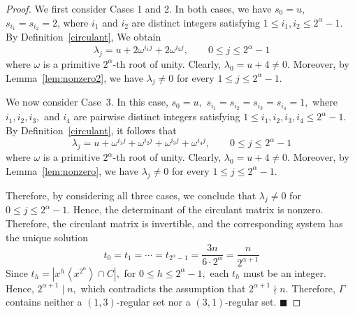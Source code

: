 \documentclass[12pt]{article}
\begin{document}
\begin{proof}
We first consider Cases 1 and 2. In both cases, we have $s_0=u$, $s_{i_1}=s_{i_2}=2$, where $i_1$ and $i_2$ are distinct integers satisfying $1\le i_1,i_2\le 2^\alpha-1$. By Definition~\ref{circulant}, We obtain
\[
\lambda_j
=
u+2\omega^{i_1j}+2\omega^{i_2j},
\qquad
0\le j\le 2^{\alpha}-1
\]
where $\omega$ is a primitive $2^{\alpha}$-th root of unity.
Clearly,
$
\lambda_0=u+4\neq0.
$
Moreover, by Lemma~\ref{lem:nonzero2}, we have $\lambda_j\ne0$ for every $1\le j\le 2^\alpha-1$.

We now consider Case~3. In this case,
$
s_0=u,$
$s_{i_1}=s_{i_2}=s_{i_3}=s_{i_4}=1,$
where \(i_1,i_2,i_3,\) and \(i_4\) are pairwise distinct integers satisfying
$
1\le i_1,i_2,i_3,i_4\le 2^{\alpha}-1.
$
By Definition~\ref{circulant}, it follows that
\[
\lambda_j
=
u+\omega^{i_1j}+\omega^{i_2j}+\omega^{i_3j}+\omega^{i_4j},
\qquad
0\le j\le 2^{\alpha}-1
\]
where $\omega$ is a primitive $2^{\alpha}$-th root of unity. Clearly,
$
\lambda_0=
u+4\neq0.
$
Moreover, by Lemma~\ref{lem:nonzero}, we have \(\lambda_j\neq0\) for every \(1\le j\le2^{\alpha}-1\).

Therefore, by considering all three cases, we conclude that
$
\lambda_j\neq0$ for $0\le j\le2^{\alpha}-1.
$
Hence, the determinant of the circulant matrix is nonzero. Therefore, the circulant matrix is invertible, and the corresponding system has the unique solution
\[
t_0=t_1=\cdots=t_{2^{\alpha}-1}
=\frac{3n}{6\cdot2^{\alpha}}
=\frac{n}{2^{\alpha+1}}
\]
Since
$
t_h=\left|x^h\left\langle x^{2^{\alpha}}\right\rangle\cap C\right|,$ for
$0\le h\le2^{\alpha}-1,
$
each \(t_h\) must be an integer. Hence,
$
2^{\alpha+1}\mid n,
$
which contradicts the assumption that
$
2^{\alpha+1}\nmid n.
$
Therefore, $\Gamma$ contains neither a $(1,3)$-regular set nor a $(3,1)$-regular set.   	\hfill$\blacksquare$		\end{proof}
\end{document}
